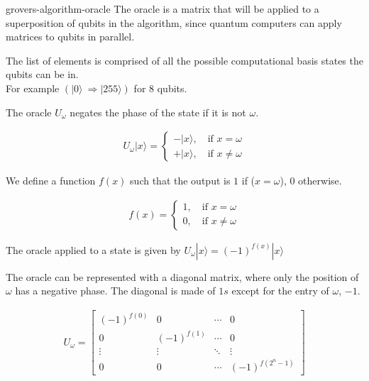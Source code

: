 \documentclass[preview]{standalone}
\begin{document}
\begin{snippet}{grovers-algorithm-oracle}
    The oracle is a matrix that will be applied to a superposition of qubits in the algorithm, since quantum computers can apply matrices to qubits in parallel.

    The list of elements is comprised of all the possible computational basis states the qubits can be in.\\
    For example \((|0\rangle\ \Rightarrow |255\rangle)\) for 8 qubits.

    The oracle \(U_\omega\) negates the phase of the state if it is not \(\omega\).

    \begin{align*}
        U_\omega|x\rangle=
        \begin{cases}
            -|x\rangle,\quad \text{if } x=\omega \\
            +|x\rangle,\quad \text{if } x\neq\omega
        \end{cases}
    \end{align*}

    We define a function \(f(x)\) such that the output is \(1\) if (\(x=\omega\)), \(0\) otherwise.

    \begin{align*}
        f(x)=
        \begin{cases}
            1,\quad \text{if } x=\omega \\
            0,\quad \text{if } x\neq\omega
        \end{cases}
    \end{align*}

    The oracle applied to a state is given by \(U_\omega|x\rangle ={(-1)}^{f(x)}|x\rangle\)

    The oracle can be represented with a diagonal matrix, where only the position of \(\omega\) has a negative phase.
    The diagonal is made of \(1s\) except for the entry of \(\omega\), \(-1\).

    \begin{align*}
        U_\omega=
        \begin{bmatrix}
            {(-1)}^{f(0)} & 0 & \cdots & 0 \\
            0 & {(-1)}^{f(1)} & \cdots & 0 \\
            \vdots & \vdots & \ddots & \vdots \\
            0 & 0 & \cdots & {(-1)}^{f(2^n-1)}
        \end{bmatrix}
    \end{align*}
\end{snippet}
\end{document}
